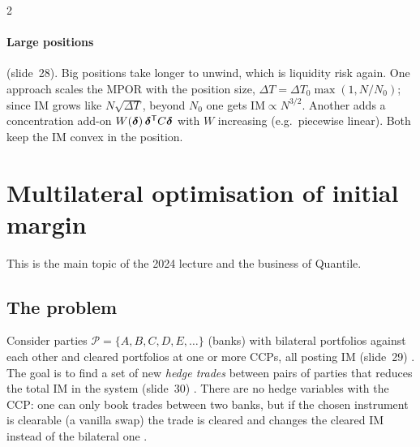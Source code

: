\begin{paracol}{2}
\paragraph{Large positions} (slide~28). Big positions take longer to unwind, which is liquidity risk again. One
approach scales the MPOR with the position size, $\Delta T=\Delta T_0\max(1,N/N_0)$; since IM grows like
$N\sqrt{\Delta T}$, beyond $N_0$ one gets $\mathrm{IM}\propto N^{3/2}$. Another adds a concentration add-on
$W(\bm\delta)\,\bm\delta^{\mathsf T} C\bm\delta$ with $W$ increasing (e.g.\ piecewise linear). Both keep the IM convex in the
position.

\section{Multilateral optimisation of initial margin}\label{ch08:sec-opt}
This is the main topic of the 2024 lecture and the business of Quantile.

\subsection{The problem}
Consider parties $\mathcal P=\{A,B,C,D,E,\dots\}$ (banks) with bilateral portfolios against each other and cleared
portfolios at one or more CCPs, all posting IM (slide~29) . The goal is to find a set of new
\emph{hedge trades} between pairs of parties that reduces the total IM in the system (slide~30)
. There are no hedge variables with the CCP: one can only book trades between two banks, but if
the chosen instrument is clearable (a vanilla swap) the trade is cleared and changes the cleared IM instead of the
bilateral one .


\end{paracol}
